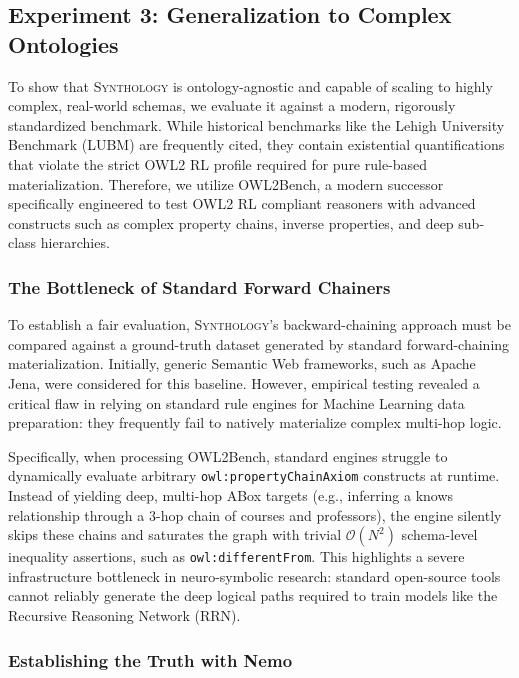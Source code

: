 \documentclass{IOS-Book-Article}     %
\begin{document}
\subsection{Experiment 3: Generalization to Complex Ontologies}

To show that \textsc{Synthology} is ontology-agnostic and capable of scaling to highly complex, real-world schemas, we evaluate it against a modern, rigorously standardized benchmark. While historical benchmarks like the Lehigh University Benchmark (LUBM) are frequently cited, they contain existential quantifications that violate the strict OWL2 RL profile required for pure rule-based materialization. Therefore, we utilize OWL2Bench, a modern successor specifically engineered to test OWL2 RL compliant reasoners with advanced constructs such as complex property chains, inverse properties, and deep sub-class hierarchies.

\subsubsection{The Bottleneck of Standard Forward Chainers}

To establish a fair evaluation, \textsc{Synthology}'s backward-chaining approach must be compared against a ground-truth dataset generated by standard forward-chaining materialization. Initially, generic Semantic Web frameworks, such as Apache Jena, were considered for this baseline. However, empirical testing revealed a critical flaw in relying on standard rule engines for Machine Learning data preparation: they frequently fail to natively materialize complex multi-hop logic.

Specifically, when processing OWL2Bench, standard engines struggle to dynamically evaluate arbitrary \texttt{owl:propertyChainAxiom} constructs at runtime. Instead of yielding deep, multi-hop ABox targets (e.g., inferring a knows relationship through a 3-hop chain of courses and professors), the engine silently skips these chains and saturates the graph with trivial $\mathcal{O}(N^2)$ schema-level inequality assertions, such as \texttt{owl:differentFrom}. This highlights a severe infrastructure bottleneck in neuro-symbolic research: standard open-source tools cannot reliably generate the deep logical paths required to train models like the Recursive Reasoning Network (RRN).

\subsubsection{Establishing the Truth with Nemo}
\end{document}
